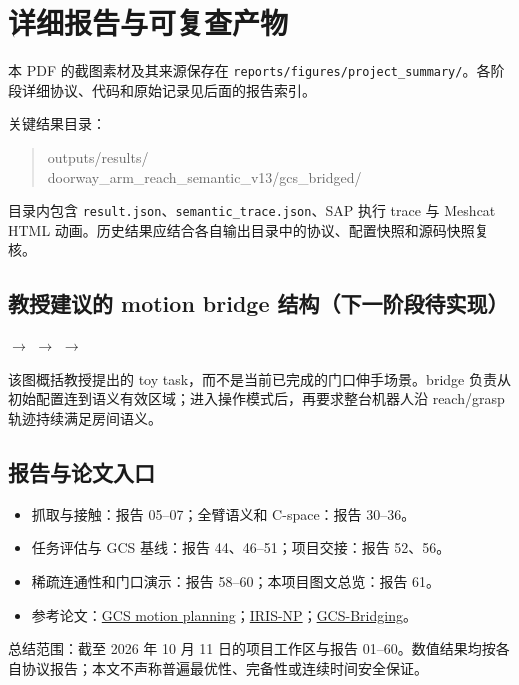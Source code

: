 \documentclass[UTF8,11pt,a4paper]{ctexart}
\begin{document}
\clearpage
\section{详细报告与可复查产物}

本 PDF 的截图素材及其来源保存在 \texttt{reports/figures/project\_summary/}。各阶段详细协议、代码和原始记录见后面的报告索引。

关键结果目录：
\begin{quote}\small\ttfamily
outputs/results/\\
doorway\_arm\_reach\_semantic\_v13/gcs\_bridged/
\end{quote}
目录内包含 \texttt{result.json}、\texttt{semantic\_trace.json}、SAP 执行 trace 与 Meshcat HTML 动画。历史结果应结合各自输出目录中的协议、配置快照和源码快照复核。

\subsection*{教授建议的 motion bridge 结构（下一阶段待实现）}
\begin{center}
\quad$\longrightarrow$\quad
{}
\quad$\longrightarrow$\quad
{}
\quad$\longrightarrow$\quad
{}
\end{center}
\small
该图概括教授提出的 toy task，而不是当前已完成的门口伸手场景。bridge 负责从初始配置连到语义有效区域；进入操作模式后，再要求整台机器人沿 reach/grasp 轨迹持续满足房间语义。
\normalsize

\subsection*{报告与论文入口}
\begin{itemize}
  \item 抓取与接触：报告 05--07；全臂语义和 C-space：报告 30--36。
  \item 任务评估与 GCS 基线：报告 44、46--51；项目交接：报告 52、56。
  \item 稀疏连通性和门口演示：报告 58--60；本项目图文总览：报告 61。
  \item 参考论文：\href{https://arxiv.org/abs/2205.04422}{GCS motion planning}；\href{https://arxiv.org/abs/2303.14737}{IRIS-NP}；\href{https://arxiv.org/abs/2608.22326}{GCS-Bridging}。
\end{itemize}

\vfill
\begin{center}\small\color{gray}
总结范围：截至 2026 年 10 月 11 日的项目工作区与报告 01--60。数值结果均按各自协议报告；本文不声称普遍最优性、完备性或连续时间安全保证。
\end{center}
\end{document}
